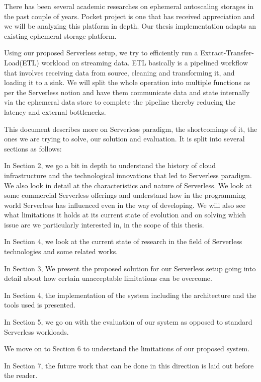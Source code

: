 \documentclass[12pt,titlepage]{article}
\begin{document}
There has been several academic researches on ephemeral autoscaling storages in
the past couple of years. Pocket project is one that has received appreciation
and we will be analyzing this platform in depth. Our thesis implementation
adapts an existing ephemeral storage platform.

Using our proposed Serverless setup, we try to efficiently run a
Extract-Transfer-Load(ETL) workload on streaming data. ETL basically is a
pipelined workflow that involves receiving data
from source, cleaning and transforming it, and loading it to a sink. We will
split the whole operation into multiple functions as per the Serverless notion
and have them communicate data and state internally via the ephemeral data store
to complete the pipeline thereby reducing the latency and external bottlenecks.

This document describes more on Serverless paradigm, the shortcomings of it, the
ones we are trying to solve, our solution and evaluation. It is split into
several sections as follows:

In Section 2, we go a bit in depth to understand the history of cloud
infrastructure and the technological innovations that led to Serverless
paradigm. We also look in detail at the characteristics and nature of
Serverless. We look at some commercial Serverless offerings and understand how
in the programming world Serverless has influenced even in the way of developing.
We will also see what limitations it holds at its current state of evolution and
on solving which issue are we particularly interested in, in the scope of this
thesis.

In Section 4, we look at the current state of research in the field of
Serverless technologies and some related works.

In Section 3, We present the proposed solution for our Serverless setup going
into detail about how certain unacceptable limitations can be overcome.

In Section 4, the implementation of the system including the architecture and
the tools used is presented.

In Section 5, we go on with the evaluation of our system as opposed to standard
Serverless workloads.

We move on to Section 6 to understand the limitations of our proposed system.

In Section 7, the future work that can be done in this direction is laid out
before the reader.
\end{document}
